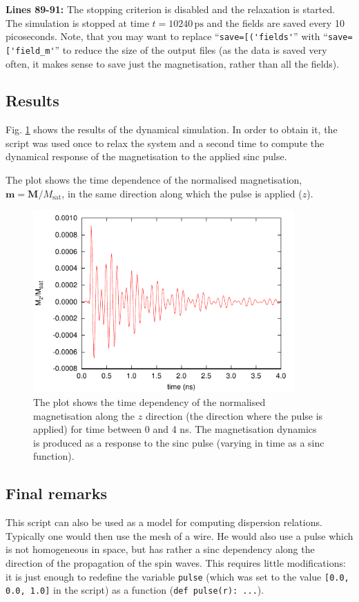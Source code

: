 \documentclass[11pt,oneside,openany]{article}
\newcommand{\vect}[1]{\mathbf{#1}}
\begin{document}
\textbf{Lines 89-91:} The stopping criterion is disabled and the relaxation is
started. The simulation is stopped at time $t = 10240\,\mathrm{ps}$ and the
fields are saved every 10 picoseconds. Note, that you may want to replace
``\verb|save=[('fields'|'' with ``\verb|save=['field_m'|'' to reduce the size
of the output files (as the data is saved very often, it makes sense to save
just the magnetisation, rather than all the fields).

\subsection{Results}
Fig. \ref{fig:results} shows the results of the dynamical simulation.
In order to obtain it, the script was used once to relax the system
and a second time to compute the dynamical response of the magnetisation
to the applied sinc pulse.

The plot shows the time dependence of the normalised magnetisation,
$\vect{m} = \vect{M}/M_\mathrm{sat}$,
in the same direction along which the pulse is applied ($z$).

\begin{figure}[!h]
\begin{center}
\includegraphics[width=10.0cm]{plot}
\end{center}
\caption{The plot shows the time dependency of the normalised magnetisation
  along the $z$ direction (the direction where the pulse is applied)
  for time between 0 and 4 ns. The magnetisation dynamics is produced as
  a response to the sinc pulse (varying in time as a sinc function).}
\label{fig:results}
\end{figure}

\subsection{Final remarks}
This script can also be used as a model for computing dispersion relations.
Typically one would then use the mesh of a wire.  He would also use a pulse
which is not homogeneous in space, but has rather a sinc dependency along the
direction of the propagation of the spin waves. This requires little
modifications: it is just enough to redefine the variable \verb|pulse| (which
was set to the value \verb|[0.0, 0.0, 1.0]| in the script) as a function
(\verb|def pulse(r): ...|).
\end{document}
